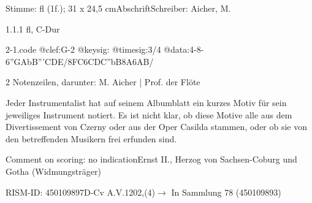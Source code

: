 \documentclass[a4paper, twocolumn, 11pt]{book}
\begin{document}
\par \textcolor{darkblue}{}  Stimme: fl  (1f.); 31 x 24,5 cm\newline Abschrift\newline Schreiber: Aicher, M.
\par 1.1.1  fl, C-Dur  
\begin{filecontents*}{2-1.code}
@clef:G-2
@keysig:
@timesig:3/4
@data:4-8-6''{GA}{bB'''CDE}/{8FC}{6CDC''bB}{8A6AB}/
\end{filecontents*}
\newline %
\par 2 Notenzeilen, darunter: M. Aicher | Prof. der Flöte
\par Jeder Instrumentalist hat auf seinem Albumblatt ein kurzes Motiv für sein jeweiliges Instrument notiert. Es ist nicht klar, ob diese Motive alle aus dem {\textquotedbl}Divertissement{\textquotedbl} von Czerny oder aus der Oper {\textquotedbl}Casilda{\textquotedbl} stammen, oder ob sie von den betreffenden Musikern frei erfunden sind.
\par Comment on scoring: no indication\newline Ernst II., Herzog von Sachsen-Coburg und Gotha  (Widmungsträger)
\par RISM-ID: 450109897\newline D-Cv  A.V.1202,(4)\newline $\rightarrow$ In Sammlung 78 (450109893)
      
\end{document}
